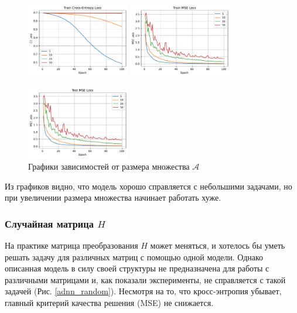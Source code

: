 \documentclass[12pt]{article}
\begin{document}
\begin{figure}
    \centering
    \includegraphics[width=0.4\textwidth]{adnn_M_epoch_train_loss.pdf}
    \quad
    \includegraphics[width=0.4\textwidth]{adnn_M_epoch_train_mse.pdf}
    
    \includegraphics[width=0.4\textwidth]{adnn_M_epoch_test_mse.pdf}
    \caption{Графики зависимостей от размера множества $\mathcal{A}$}
    \label{adnn_M}
\end{figure}

Из графиков видно, что модель хорошо справляется с небольшими задачами, но при увеличении размера множества начинает работать хуже.

\subsubsection{Случайная матрица \texorpdfstring{$H$}{H}}

На практике матрица преобразования $H$ может меняться, и хотелось бы уметь решать задачу для различных матриц с помощью одной модели. Однако описанная модель в силу своей структуры не предназначена для работы с различными матрицами и, как показали эксперименты, не справляется с такой задачей (Рис. \ref{adnn_random}). Несмотря на то, что кросс-энтропия убывает, главный критерий качества решения (MSE) не снижается.
\end{document}
